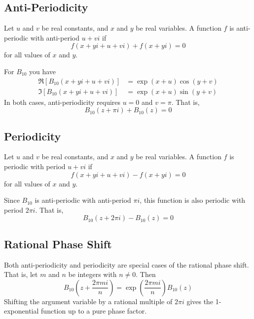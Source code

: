 \subsection{Anti-Periodicity}
Let $u$ and $v$ be real constants, and $x$ and $y$ be real variables. A function $f$ is anti-periodic with anti-period $u + v i $ if
\begin{equation}
    f(x + y i + u + v i) + f(x + y i) = 0
\end{equation}
for all values of $x$ and $y$.

For $B_{10}$ you have
\begin{align}
    \Re\left[ B_{10}(x + y i + u + v i) \right] &= \exp({x} + u) \cos(y + v) \\
    \Im\left[ B_{10}(x + y i + u + v i) \right] &= \exp({x} + u) \sin(y + v)
\end{align}
In both cases, anti-periodicity requires $u = 0$ and $v = \pi$. That is,
\begin{equation}
    B_{10}(z + \pi i) + B_{10}(z) = 0
\end{equation}
\subsection{Periodicity}
Let $u$ and $v$ be real constants, and $x$ and $y$ be real variables. A function $f$ is periodic with period $u + v i $ if
\begin{equation}
    f(x + y i + u + v i) - f(x + y i) = 0
\end{equation}
for all values of $x$ and $y$.

Since $B_{10}$ is anti-periodic with anti-period $\pi i$, this function is also periodic with period $2 \pi i$. That is,
\begin{equation}
    B_{10}(z + 2 \pi i) - B_{10}(z) = 0
\end{equation}
\subsection{Rational Phase Shift}
Both anti-periodicity and periodicity are special cases of the rational phase shift. That is, let $m$ and $n$ be integers with $n \neq 0$. Then
\begin{equation}
    B_{10}\left(z + \frac{2\pi m i}{n}\right) = \exp\left( \frac{2\pi m i}{n} \right) B_{10}(z)
\end{equation}
Shifting the argument variable by a rational multiple of $2 \pi i$ gives the 1-exponential function up to a pure phase factor.